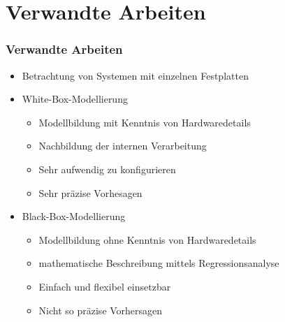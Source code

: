 \documentclass{beamer}
\begin{document}
\section{Verwandte Arbeiten}
\begin{frame}
\frametitle{Verwandte Arbeiten}
\begin{itemize}
	\item Betrachtung von Systemen mit einzelnen Festplatten
	\item White-Box-Modellierung
	\begin{itemize}
		\item Modellbildung mit Kenntnis von Hardwaredetails
		\item Nachbildung der internen Verarbeitung
		\item Sehr aufwendig zu konfigurieren
		\item Sehr präzise Vorhesagen
	\end{itemize}
	\item Black-Box-Modellierung
	\begin{itemize}
		\item Modellbildung ohne Kenntnis von Hardwaredetails
		\item mathematische Beschreibung mittels Regressionsanalyse
		\item Einfach und flexibel einsetzbar
		\item Nicht so präzise Vorhersagen
	\end{itemize}
\end{itemize}
\end{frame}
\end{document}
